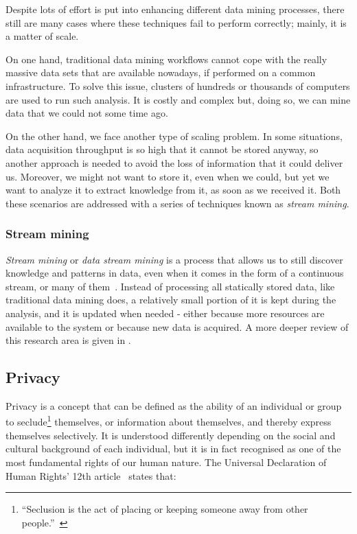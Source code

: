Despite lots of effort is put into enhancing different data mining processes, there still 
are many cases where these techniques fail to perform correctly; mainly, it is a matter of scale.

On one hand, traditional data mining workflows cannot cope with the really massive 
data sets that are available nowadays, if performed on a common infrastructure. 
To solve this issue, clusters of hundreds or thousands of computers are used to run 
such analysis. It is costly and complex but, doing so, we can mine data that we could not 
some time ago.

On the other hand, we face another type of scaling problem. In some situations, data 
acquisition throughput is so high that it cannot be stored anyway, so another approach 
is needed to avoid the loss of information that it could deliver us. Moreover, we might 
not want to store it, even when we could, but yet we want to analyze it to extract 
knowledge from it, as soon as we received it. Both these scenarios are addressed with a 
series of techniques known as \textit{stream mining}.

\subsubsection{Stream mining}

\textit{Stream mining} or \textit{data stream mining} is a process that allows us to 
still discover knowledge and patterns in data, even when it comes in the form of a 
continuous stream, or many of them~\citep{Rajaraman:MiningMassiveDatasets}. Instead of processing 
all statically stored data, like traditional data mining does, a relatively small 
portion of it is kept during the analysis, and it is updated when needed - either because 
more resources are available to the system or because new data is acquired. A more deeper 
review of this research area is given in .

\subsection{Privacy}

Privacy is a concept that can be defined as the ability of an individual or group to 
seclude\footnote{“Seclusion is the act of placing or keeping someone away from other people.”~\citep{web:Merriam:Seclusion}} themselves, or information about themselves, and 
thereby express themselves selectively. It is understood differently depending on the social 
and cultural background of each individual, but it is in fact recognised as one of the most 
fundamental rights of our human nature. The Universal Declaration of Human Rights’ 12th 
article~\citep{web:UN:HumanRightsDeclaration} states that:

